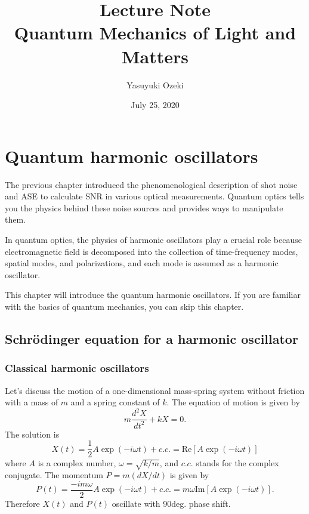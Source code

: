 \documentclass{book}
\begin{document}
\title{Lecture Note \\ Quantum Mechanics of Light and Matters}
\author{Yasuyuki Ozeki}
\date{July 25, 2020}

\maketitle
\tableofcontents
\mainmatter


%
%

\chapter{Quantum harmonic oscillators}
The previous chapter introduced the phenomenological description of shot noise and ASE to calculate SNR in various optical measurements. Quantum optics tells you the physics behind these noise sources and provides ways to manipulate them.

In quantum optics, the physics of harmonic oscillators play a crucial role because electromagnetic field is decomposed into the collection of time-frequency modes, spatial modes, and polarizations, and each mode is assumed as a harmonic oscillator. 

This chapter will introduce the quantum harmonic oscillators. If you are familiar with the basics of quantum mechanics, you can skip this chapter.

\section{Schr\"odinger equation for a harmonic oscillator}
\subsection{Classical harmonic oscillators}

Let's discuss the motion of a one-dimensional mass-spring system without friction with a mass of $m$ and a spring constant of $k$. The equation of motion is given by
\begin{equation}
  m\frac{d^2X}{dt^2}+kX = 0.
\end{equation}
The solution is
\begin{equation}
  X(t) = \frac 1 2 A \exp (-i\omega t) + c.c. = \mathrm{Re}[A\exp(-i\omega t)]
 \label{eq:solution_of_classical_harmonic_oscillator}
\end{equation}
where $A$ is a complex number, $\omega = \sqrt{k/m}$, and $c.c.$ stands for the complex conjugate. The momentum $P = m (dX/dt)$ is given by
\begin{equation}
  P(t) = \frac {-im\omega}{2}A\exp(-i\omega t)+c.c. = m\omega\mathrm {Im}[A\exp(-i\omega t)].
\end{equation}
Therefore $X(t)$ and $P(t)$ oscillate with 90deg. phase shift.
\end{document}
